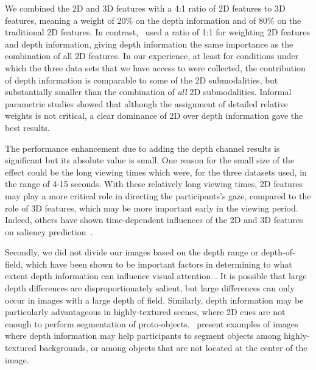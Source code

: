 We combined the 2D and 3D features with a 4:1 ratio of 2D features to 3D features, meaning a weight of 20\% on the depth information and of 80\% on the traditional 2D features. In contrast,~\cite{Wang_etal13} used a ratio of 1:1 for weighting 2D features and depth information, giving depth information the same importance as the combination of all 2D features. In our experience, at least for conditions under which the three data sets that we have access to were collected, the contribution of depth information is comparable to some of the 2D submodalities, but substantially smaller than the combination of {\em all} 2D submodalities. Informal parametric studies showed that although the assignment of detailed relative weights is not critical, a clear dominance of 2D over depth information gave the best results. 

The performance enhancement due to adding the depth channel results is significant but its absolute value is small. One reason for the small size of the effect could be the long viewing times which were, for the three datasets used, in the range of 4-15 seconds. With these relatively long viewing times, 2D features may play a more critical role in directing the participants's gaze, compared to the role of 3D features, which may be more important early in the viewing period. Indeed, others have shown time-dependent influences of the 2D and 3D features on saliency prediction~\citep{Gautier_LeMeur12}.

Secondly, we did not divide our images based on the depth range or depth-of-field, which have been shown to be important factors in determining to what extent depth information can influence visual attention~\citep{Lang_etal12}. It is possible that large depth differences are disproportionately salient, but large differences can only occur in images with a large depth of field. Similarly, depth information may be particularly advantageous in highly-textured scenes, where 2D cues are not enough to perform segmentation of proto-objects.~\cite{Ma_Hang15} present examples of images where depth information may help participants to segment objects among highly-textured backgrounds, or among objects that are not located at the center of the image.

